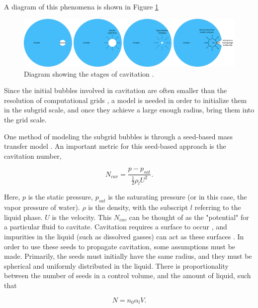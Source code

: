 \documentclass{UCF_ETD}
\begin{document}
A diagram of this phenomena is shown in Figure \ref{fig:cavDiagram}

\begin{figure}
    \centering
    \includegraphics[width=\linewidth]{Figures/cavDiagram.png}
    \caption{Diagram showing the stages of cavitation \cite{Plesset1977, Yasui2018, kedrinskii2007shock}.}
    \label{fig:cavDiagram}
\end{figure}


Since the initial bubbles involved in cavitation are often smaller than the resolution of computational grids \cite{CAUPIN20061000}, a model is needed in order to initialize them in the subgrid scale, and once they achieve a large enough radius, bring them into the grid scale. 

One method of modeling the subgrid bubbles is through a seed-based mass transfer model \cite{Sauer2000InstationrKS}. An important metric for this seed-based approach is the cavitation number,

\begin{equation}
    N_{cav} = \frac{p - p_{sat}}{\frac{1}{2}\rho_{l}U^{2}}.
    \label{eq:cavitationNumber}
\end{equation}

Here, $p$ is the static pressure, $p_{sat}$ is the saturating pressure (or in this case, the vapor pressure of water). $\rho$ is the density, with the subscript $l$ referring to the liquid phase. $U$ is the velocity. This $N_{cav}$ can be thought of as the "potential" for a particular fluid to cavitate. Cavitation requires a surface to occur \cite{CAUPIN20061000}, and impurities in the liquid (such as dissolved gasses) can act as these surfaces \cite{starccm}. In order to use these seeds to propagate cavitation, some assumptions must be made. Primarily, the seeds must initially have the same radius, and they must be spherical and uniformly distributed in the liquid. There is proportionality between the number of seeds in a control volume, and the amount of liquid, such that

\begin{equation}
    N = n_{0}\alpha_{l}V.
    \label{eq:num_seeds}
\end{equation}
\end{document}
